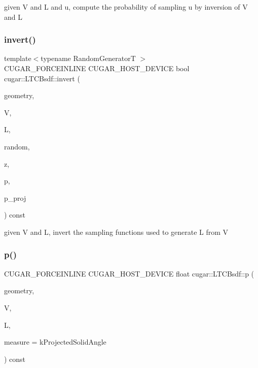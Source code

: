 given V and L and u, compute the probability of sampling u by inversion of V and L \mbox{\label{structcugar_1_1_l_t_c_bsdf_ab39d377d432dd5c39fe5942e245ba41a}} 
\subsubsection{\texorpdfstring{invert()}{invert()}}
{\footnotesize\ttfamily template$<$typename Random\+GeneratorT $>$ \\
C\+U\+G\+A\+R\+\_\+\+F\+O\+R\+C\+E\+I\+N\+L\+I\+NE C\+U\+G\+A\+R\+\_\+\+H\+O\+S\+T\+\_\+\+D\+E\+V\+I\+CE bool cugar\+::\+L\+T\+C\+Bsdf\+::invert (\begin{DoxyParamCaption}\item[{const \hyperlink{structcugar_1_1_differential_geometry}{Differential\+Geometry} \&}]{geometry,  }\item[{const \hyperlink{structcugar_1_1_vector}{Vector3f}}]{V,  }\item[{const \hyperlink{structcugar_1_1_vector}{Vector3f}}]{L,  }\item[{Random\+GeneratorT \&}]{random,  }\item[{\hyperlink{structcugar_1_1_vector}{Vector3f} \&}]{z,  }\item[{float \&}]{p,  }\item[{float \&}]{p\+\_\+proj }\end{DoxyParamCaption}) const\hspace{0.3cm}{\ttfamily [inline]}}

given V and L, invert the sampling functions used to generate L from V \mbox{\label{structcugar_1_1_l_t_c_bsdf_a0e537e0db592b6bbc37bdae20b575ea3}} 
\subsubsection{\texorpdfstring{p()}{p()}}
{\footnotesize\ttfamily C\+U\+G\+A\+R\+\_\+\+F\+O\+R\+C\+E\+I\+N\+L\+I\+NE C\+U\+G\+A\+R\+\_\+\+H\+O\+S\+T\+\_\+\+D\+E\+V\+I\+CE float cugar\+::\+L\+T\+C\+Bsdf\+::p (\begin{DoxyParamCaption}\item[{const \hyperlink{structcugar_1_1_differential_geometry}{Differential\+Geometry} \&}]{geometry,  }\item[{const \hyperlink{structcugar_1_1_vector}{Vector3f}}]{V,  }\item[{const \hyperlink{structcugar_1_1_vector}{Vector3f}}]{L,  }\item[{const Spherical\+Measure}]{measure = {\ttfamily kProjectedSolidAngle} }\end{DoxyParamCaption}) const\hspace{0.3cm}{\ttfamily [inline]}}

